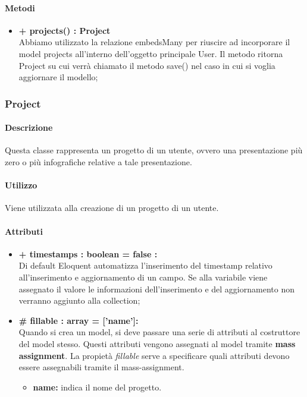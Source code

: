 	\paragraph{Metodi}
	\begin{itemize}
		\item \textbf{+ projects() : Project}\\
		Abbiamo utilizzato la relazione embedsMany per riuscire ad incorporare il model projects all'interno dell'oggetto principale User. Il metodo ritorna Project su cui verrà chiamato il metodo save() nel caso in cui si voglia aggiornare il modello;
	\end{itemize}
\newpage

\subsubsection{Project}

	
	\paragraph{Descrizione}
	Questa classe rappresenta un progetto di un utente, ovvero una presentazione più zero o più infografiche relative a tale presentazione.
	
	\paragraph{Utilizzo}
	Viene utilizzata alla creazione di un progetto di un utente.
	
	\paragraph{Attributi}
	\begin{itemize}
		\item \textbf{+ timestamps : boolean = false :}\\
		Di default Eloquent automatizza l'inserimento del timestamp relativo all'inserimento e aggiornamento di un campo. Se alla variabile viene assegnato il valore le informazioni dell'inserimento e del aggiornamento non verranno aggiunto alla collection;
		\item \textbf{\# fillable : array = [’name’]:}\\
		Quando si crea un model, si deve passare una serie di attributi al costruttore del model stesso. Questi attributi vengono assegnati al model tramite \textbf{mass assignment}. La propietà \textit{fillable} serve a specificare quali attributi devono essere assegnabili tramite il mass-assignment.
		\begin{itemize}
			\item \textbf{name:} indica il nome del progetto.
		\end{itemize}
	\end{itemize}
	
